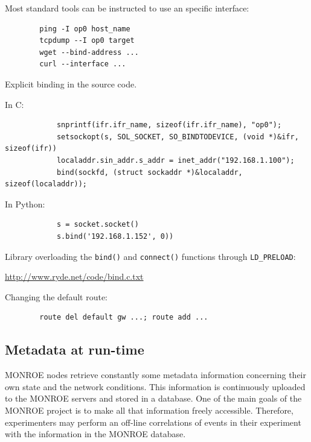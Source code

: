 \documentclass[a4paper,10pt]{article}
\newcommand{\VerbatimFont}{\footnotesize}
\newcommand{\monroe}{MONROE}
\newcommand{\identifier}[1]{{\texttt{\small{#1}}}}
\begin{document}
\begin{enumerate*}
	\item Most standard tools can be instructed to use an specific interface:
	{	\VerbatimFont
		\begin{verbatim}
		ping -I op0 host_name
		tcpdump --I op0 target
		wget --bind-address ...
		curl --interface ...
		\end{verbatim}
	}
	
	\item Explicit binding in the source code.
	\begin{itemize*}
		\item In C:
		{
			\VerbatimFont
			\begin{verbatim}
			snprintf(ifr.ifr_name, sizeof(ifr.ifr_name), "op0");
			setsockopt(s, SOL_SOCKET, SO_BINDTODEVICE, (void *)&ifr, sizeof(ifr))
			localaddr.sin_addr.s_addr = inet_addr("192.168.1.100");
			bind(sockfd, (struct sockaddr *)&localaddr, sizeof(localaddr));
			\end{verbatim}
		}
		\item In Python:
		{
			\VerbatimFont
			\begin{verbatim}
			s = socket.socket()
			s.bind('192.168.1.152', 0))
			\end{verbatim}
		}
	\end{itemize*}
	
	\item Library overloading the \identifier{bind()} and \identifier{connect()} functions through \identifier{LD\_PRELOAD}:
	
	\url{http://www.ryde.net/code/bind.c.txt}
	
	\item Changing the default route:
	{
		\VerbatimFont
		\begin{verbatim}
		route del default gw ...; route add ...
		\end{verbatim}
	}
\end{enumerate*}


\subsection{Metadata at run-time}
\label{subsec:metadataRunTime}

\monroe{} nodes retrieve constantly some metadata information concerning their own state and the network conditions.
This information is continuously uploaded to the \monroe{} servers and stored in a database.
One of the main goals of the \monroe{} project is to make all that information freely accessible.
Therefore, experimenters may perform an off-line correlations of events in their experiment with the information in the \monroe{} database.
\end{document}
